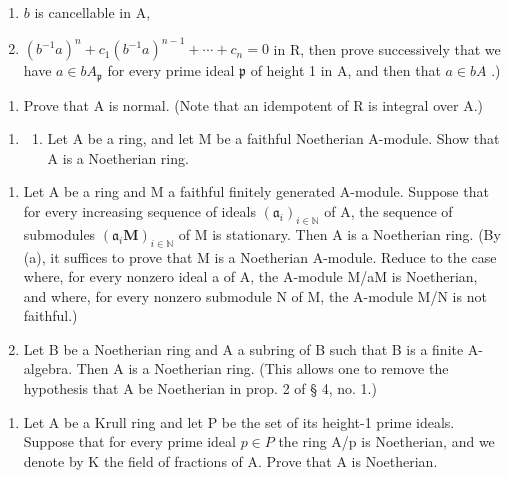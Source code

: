 \begin{enumerate}
\def\labelenumi{(\roman{enumi})}
\item
  \(b\) is cancellable in A,
\item
  \((b^{-1}a)^{n} + c_{1}(b^{-1}a)^{n-1} + \cdots + c_{n} = 0\) in R, then prove successively that we have \(a \in bA_{\mathfrak{p}}\) for every prime ideal \(\mathfrak{p}\) of height 1 in A, and then that \(a \in bA\) .)
\end{enumerate}

\begin{enumerate}
\def\labelenumi{\alph{enumi})}
\setcounter{enumi}{3}
\tightlist
\item
  Prove that A is normal. (Note that an idempotent of R is integral over A.)
\end{enumerate}

\begin{enumerate}
\def\labelenumi{\arabic{enumi})}
\setcounter{enumi}{5}
\tightlist
\item
  \begin{enumerate}
  \def\labelenumii{\alph{enumii})}
  \tightlist
  \item
    Let A be a ring, and let M be a faithful Noetherian A-module. Show that A is a Noetherian ring.
  \end{enumerate}
\end{enumerate}

\begin{enumerate}
\def\labelenumi{\alph{enumi})}
\setcounter{enumi}{1}
\item
  Let A be a ring and M a faithful finitely generated A-module. Suppose that for every increasing sequence of ideals \((\mathfrak{a}_{i})_{i\in\mathbb{N}}\) of A, the sequence of submodules \((\mathfrak{a}_{i}\mathbf{M})_{i\in\mathbb{N}}\) of M is stationary. Then A is a Noetherian ring. (By (a), it suffices to prove that M is a Noetherian A-module. Reduce to the case where, for every nonzero ideal a of A, the A-module M/aM is Noetherian, and where, for every nonzero submodule N of M, the A-module M/N is not faithful.)
\item
  Let B be a Noetherian ring and A a subring of B such that B is a finite A-algebra. Then A is a Noetherian ring. (This allows one to remove the hypothesis that A be Noetherian in prop. 2 of § 4, no. 1.)
\end{enumerate}

\begin{enumerate}
\def\labelenumi{\arabic{enumi})}
\setcounter{enumi}{6}
\tightlist
\item
  Let A be a Krull ring and let P be the set of its height-1 prime ideals. Suppose that for every prime ideal \(p \in P\) the ring A/p is Noetherian, and we denote by K the field of fractions of A. Prove that A is Noetherian.
\end{enumerate}

